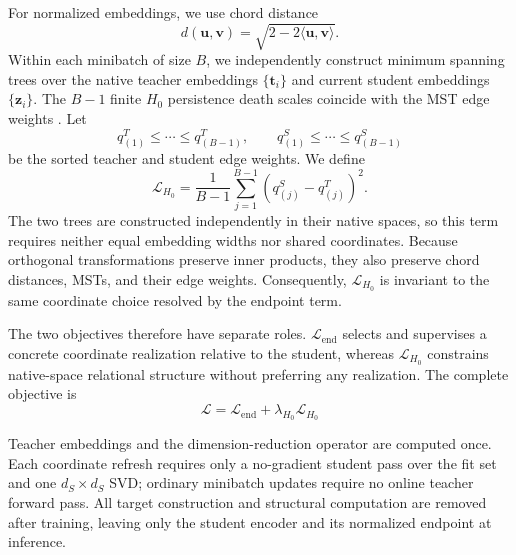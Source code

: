 For normalized embeddings, we use chord distance
\begin{equation}
    d(\mathbf{u},\mathbf{v})
    =\sqrt{2-2\langle\mathbf{u},\mathbf{v}\rangle}.
    \label{eq:chord-distance}
\end{equation}
Within each minibatch of size $B$, we independently construct minimum spanning
trees over the native teacher embeddings $\{\mathbf{t}_i\}$ and current student
embeddings $\{\mathbf{z}_i\}$. The $B-1$ finite $H_0$ persistence death scales
coincide with the MST edge weights \citep{hofer2020topologically}. Let
\begin{equation}
    q_{(1)}^T\leq\cdots\leq q_{(B-1)}^T,
    \qquad
    q_{(1)}^S\leq\cdots\leq q_{(B-1)}^S
    \label{eq:sorted-mst-weights}
\end{equation}
be the sorted teacher and student edge weights. We define
\begin{equation}
    \mathcal{L}_{H_0}
    =\frac{1}{B-1}\sum_{j=1}^{B-1}
      \left(q_{(j)}^S-q_{(j)}^T\right)^2.
    \label{eq:h0-loss}
\end{equation}
The two trees are constructed independently in their native spaces, so this
term requires neither equal embedding widths nor shared coordinates. Because
orthogonal transformations preserve inner products, they also preserve chord
distances, MSTs, and their edge weights. Consequently, $\mathcal{L}_{H_0}$ is
invariant to the same coordinate choice resolved by the endpoint term.

The two objectives therefore have separate roles.
$\mathcal{L}_{\mathrm{end}}$ selects and supervises a concrete coordinate
realization relative to the student, whereas $\mathcal{L}_{H_0}$ constrains
native-space relational structure without preferring any realization. The
complete objective is
\begin{equation}
    {
        \mathcal{L}
        =\mathcal{L}_{\mathrm{end}}
        +\lambda_{H_0}\mathcal{L}_{H_0}
    }
    \label{eq:complete-objective}
\end{equation}

Teacher embeddings and the dimension-reduction operator are computed once.
Each coordinate refresh requires only a no-gradient student pass over the fit
set and one $d_S\times d_S$ SVD; ordinary minibatch updates require no online
teacher forward pass. All target construction and structural computation are
removed after training, leaving only the student encoder and its normalized
endpoint at inference.
